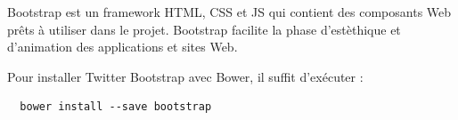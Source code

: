 \documentclass[a4paper,11pt,oneside]{report}
\begin{document}
\begin{appendices}
Bootstrap est un framework HTML, CSS et JS qui contient des composants Web prêts à utiliser dans le projet. Bootstrap facilite la phase d'estèthique et d'animation des applications et sites Web.
\newline

Pour installer Twitter Bootstrap avec Bower, il suffit d'exécuter :
  \begin{verbatim}
  bower install --save bootstrap
  \end{verbatim}

\end{appendices}





\newpage
\end{document}
